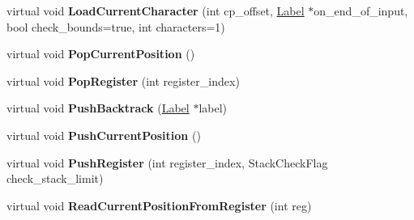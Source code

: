 \begin{DoxyCompactItemize}
\item 
virtual void {\bfseries Load\+Current\+Character} (int cp\+\_\+offset, \hyperlink{classv8_1_1internal_1_1_label}{Label} $\ast$on\+\_\+end\+\_\+of\+\_\+input, bool check\+\_\+bounds=true, int characters=1)\hypertarget{classv8_1_1internal_1_1_reg_exp_macro_assembler_a_r_m64_a53d27bac62d9082ecdc4f54a84edb680}{}\label{classv8_1_1internal_1_1_reg_exp_macro_assembler_a_r_m64_a53d27bac62d9082ecdc4f54a84edb680}

\item 
virtual void {\bfseries Pop\+Current\+Position} ()\hypertarget{classv8_1_1internal_1_1_reg_exp_macro_assembler_a_r_m64_a7b6bee4e19011e02136e91377cefc38d}{}\label{classv8_1_1internal_1_1_reg_exp_macro_assembler_a_r_m64_a7b6bee4e19011e02136e91377cefc38d}

\item 
virtual void {\bfseries Pop\+Register} (int register\+\_\+index)\hypertarget{classv8_1_1internal_1_1_reg_exp_macro_assembler_a_r_m64_a8acbb3d815f6807cd8564ec9b660f8a9}{}\label{classv8_1_1internal_1_1_reg_exp_macro_assembler_a_r_m64_a8acbb3d815f6807cd8564ec9b660f8a9}

\item 
virtual void {\bfseries Push\+Backtrack} (\hyperlink{classv8_1_1internal_1_1_label}{Label} $\ast$label)\hypertarget{classv8_1_1internal_1_1_reg_exp_macro_assembler_a_r_m64_a77e6fab918a2b8b5ecf4660fd7e99f01}{}\label{classv8_1_1internal_1_1_reg_exp_macro_assembler_a_r_m64_a77e6fab918a2b8b5ecf4660fd7e99f01}

\item 
virtual void {\bfseries Push\+Current\+Position} ()\hypertarget{classv8_1_1internal_1_1_reg_exp_macro_assembler_a_r_m64_a9532d11e4c228febdb9076cdddbc1c8a}{}\label{classv8_1_1internal_1_1_reg_exp_macro_assembler_a_r_m64_a9532d11e4c228febdb9076cdddbc1c8a}

\item 
virtual void {\bfseries Push\+Register} (int register\+\_\+index, Stack\+Check\+Flag check\+\_\+stack\+\_\+limit)\hypertarget{classv8_1_1internal_1_1_reg_exp_macro_assembler_a_r_m64_af0d4ab0dbce57686396da5ff5a4268eb}{}\label{classv8_1_1internal_1_1_reg_exp_macro_assembler_a_r_m64_af0d4ab0dbce57686396da5ff5a4268eb}

\item 
virtual void {\bfseries Read\+Current\+Position\+From\+Register} (int reg)\hypertarget{classv8_1_1internal_1_1_reg_exp_macro_assembler_a_r_m64_a67276bbc53937eeb036d9b7ba441c17c}{}\label{classv8_1_1internal_1_1_reg_exp_macro_assembler_a_r_m64_a67276bbc53937eeb036d9b7ba441c17c}


\end{DoxyCompactItemize}
